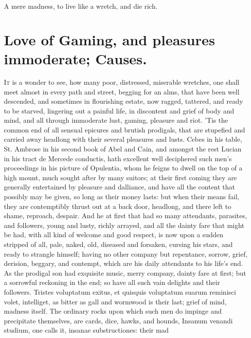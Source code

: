 {{A mere madness, to live like a wretch, and die rich.

\section[Love of Gaming]{Love of Gaming, \etc{} and pleasures immoderate; Causes.}

\lettrine{I}{t} is a wonder to see, how many poor, distressed, miserable wretches,
one shall meet almost in every path and street, begging for an alms,
that have been well descended, and sometimes in flourishing estate, now
ragged, tattered, and ready to be starved, lingering out a painful
life, in discontent and grief of body and mind, and all through
immoderate lust, gaming, pleasure and riot. 'Tis the common end of all
sensual epicures and brutish prodigals, that are stupefied and carried
away headlong with their several pleasures and lusts. Cebes in his
table, St. Ambrose in his second book of Abel and Cain, and amongst the
rest Lucian in his tract de Mercede conductis, hath excellent well
deciphered such men's proceedings in his picture of Opulentia, whom he
feigns to dwell on the top of a high mount, much sought after by many
suitors; at their first coming they are generally entertained by
pleasure and dalliance, and have all the content that possibly may be
given, so long as their money lasts: but when their means fail, they
are contemptibly thrust out at a back door, headlong, and there left to
shame, reproach, despair. And he at first that had so many attendants,
parasites, and followers, young and lusty, richly arrayed, and all the
dainty fare that might be had, with all kind of welcome and good
respect, is now upon a sudden stripped of all, pale, naked, old,
diseased and forsaken, cursing his stars, and ready to strangle
himself; having no other company but repentance, sorrow, grief,
derision, beggary, and contempt, which are his daily attendants to his
life's end. As the prodigal son had exquisite music, merry
company, dainty fare at first; but a sorrowful reckoning in the end; so
have all such vain delights and their followers. Tristes
voluptatum exitus, et quisquis voluptatum suarum reminisci volet,
intelliget, as bitter as gall and wormwood is their last; grief of
mind, madness itself. The ordinary rocks upon which such men do impinge
and precipitate themselves, are cards, dice, hawks, and hounds, Insanum
venandi studium, one calls it, insanae substructiones: their mad
}}
